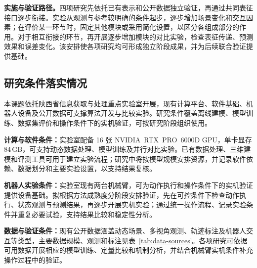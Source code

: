 \textbf{实施与验证路径。}四项研究先依托已有表示和公开数据独立验证，再通过共同表征接口逐步衔接。实验从观测与参考较明确的条件起步，逐步增加场景变化和交互因素；在评价某一环节时，固定其他模块或采用简化设置，以区分各组成部分的作用。对于相互衔接的环节，再开展逐步增加模块的对比实验，检查表征传递、预测效果和误差变化。该安排使各项研究均可形成独立阶段成果，并为后续联合验证提供基础。

\subsection{研究条件落实情况}

本课题依托陕西省信息获取与处理重点实验室开展，现有计算平台、软件基础、机器人设备及公开数据可支撑算法开发与比较实验。研究条件覆盖离线建模、模型训练、数据集评价和操作条件下的实机验证，可按研究阶段组织使用。

\textbf{计算与软件条件：}实验室配备 16 张 \mbox{NVIDIA RTX PRO 6000D} GPU，单卡显存 84\,GB，可支持动态数据处理、模型训练及并行对比实验。已有数据处理、三维建模和评测工具可用于建立实验流程；研究中将按模型规模安排资源，并记录软件依赖、数据划分和主要实验设置，以支持结果复核。

\textbf{机器人实验条件：}实验室现有两台机械臂，可为动作执行和操作条件下的实机验证提供设备基础。拟根据方法成熟度分阶段安排验证，先在可控条件下检查动作执行、状态观测与预测结果，再逐步开展实机实验；通过统一操作流程、记录实验条件并重复必要试验，支持结果比较和稳定性分析。

\textbf{数据与验证条件：}现有公开数据涵盖动态场景、多视角观测、轨迹标注及机器人交互等类型，主要数据规模、观测和标注见表~\ref{tab:data-sources}。各项研究可依据可用数据开展相应的模型训练、定量比较和机制分析，并结合机械臂实机条件补充操作过程中的验证。

